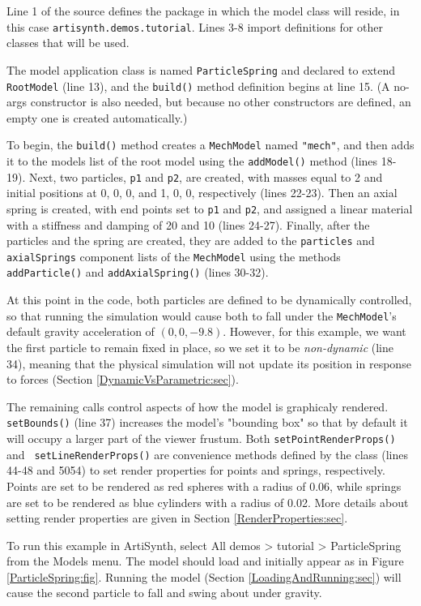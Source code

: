 Line 1 of the source defines the package in which the model class will
reside, in this case {\tt artisynth.demos.tutorial}. Lines 3-8 import
definitions for other classes that will be used.

The model application class is named {\tt ParticleSpring} and declared
to extend {\tt RootModel} (line 13), and the {\tt build()} method
definition begins at line 15. (A no-args constructor is also needed,
but because no other constructors are defined, an empty one is created
automatically.)

To begin, the {\tt build()} method creates a {\tt MechModel} named
{\tt "mech"}, and then adds it to the models list of the root model
using the {\tt addModel()} method (lines 18-19). Next, two particles,
{\tt p1} and {\tt p2}, are created, with masses equal to 2 and initial
positions at 0, 0, 0, and 1, 0, 0, respectively (lines 22-23). Then an
axial spring is created, with end points set to {\tt p1} and {\tt p2},
and assigned a linear material with a stiffness and damping of 20 and
10 (lines 24-27). Finally, after the particles and the spring are
created, they are added to the {\tt particles} and {\tt axialSprings}
component lists of the {\tt MechModel} using the methods {\tt
addParticle()} and {\tt addAxialSpring()} (lines 30-32).

At this point in the code, both particles are defined to be
dynamically controlled, so that running the simulation would cause
both to fall under the {\tt MechModel}'s default gravity acceleration
of $(0, 0, -9.8)$. However, for this example, we want the first
particle to remain fixed in place, so we set it to be {\it
non-dynamic} (line 34), meaning that the physical simulation will not
update its position in response to forces (Section
\ref{DynamicVsParametric:sec}).

The remaining calls control aspects of how the model is graphicaly
rendered.  {\tt setBounds()} (line 37) increases the model's "bounding
box" so that by default it will occupy a larger part of the viewer
frustum. Both {\tt setPointRenderProps()} and {\tt
setLineRenderProps()} are convenience methods defined by the class
(lines 44-48 and 5054) to set render properties for points and
springs, respectively. Points are set to be rendered as red spheres
with a radius of 0.06, while springs are set to be rendered as blue
cylinders with a radius of 0.02. More details about setting render
properties are given in Section \ref{RenderProperties:sec}.

To run this example in ArtiSynth, select {\sf All demos > tutorial >
ParticleSpring} from the {\sf Models} menu. The model should load and
initially appear as in Figure \ref{ParticleSpring:fig}.  Running
the model (Section \ref{LoadingAndRunning:sec}) will
cause the second particle to fall and swing about under gravity.

